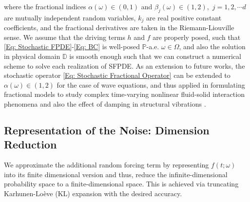 %
where the fractional indices $\alpha(\omega) \in (0,1)$ and $\beta_j(\omega) \in (1,2), \,\, j=1,2,\cdots d$ are mutually independent random variables, $k_{j}$ are real positive constant coefficients, and the fractional derivatives are taken in the Riemann-Liouville sense. 
We assume that the driving terms $h$ and $f$ are properly posed, such that \eqref{Eq: Stochastic FPDE}-\eqref{Eq: BC} is well-posed $\mathbb{P}$-a.e. $\omega \in \Omega$, and also the solution in physical domain $\mathbb{D}$ is smooth enough such that we can construct a numerical scheme to solve each realization of SFPDE. As an extension to future works, the stochastic operator \eqref{Eq: Stochastic Fractional Operator} can be extended to $\alpha(\omega) \in (1,2)$ for the case of wave equations, and thus applied in formulating fractional models to study complex time-varying nonlinear fluid-solid interaction phenomena \cite{atanackovic2014,afzali2016vibrational,afzali2017analysis} and also the effect of damping in structural vibrations \cite{zamani2015asymmetric}.




%
%
\subsection{Representation of the Noise: Dimension Reduction}
\label{Sec: Noise}
%
%
We approximate the additional random forcing term by representing $f(t;\omega)$ into its finite dimensional version and thus, reduce the infinite-dimensional probability space to a finite-dimensional space. This is achieved via truncating Karhunen-Lo\`{e}ve (KL) expansion with the desired accuracy\cite{Loeve77}. 

